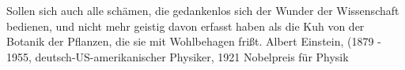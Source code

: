 {Sollen sich auch alle schämen, die gedankenlos sich der Wunder der Wissenschaft bedienen, und nicht mehr geistig davon erfasst haben als die Kuh von der Botanik der Pflanzen, die sie mit Wohlbehagen frißt.}
{Albert Einstein, (1879 - 1955, deutsch-US-amerikanischer Physiker, 1921 Nobelpreis für Physik}



\vfill
{}
\newpage





